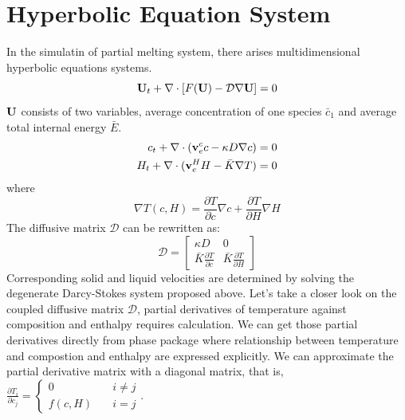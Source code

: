 \section{Hyperbolic Equation System}
In the simulatin of partial melting system, 
there arises multidimensional hyperbolic equations systems.
\begin{equation}
		  \bold{U}_t + \nabla \cdot [F(\bold{U}) - \mathcal{D}\nabla \bold{U}] = 0
\end{equation}
$\bold{U}$ consists of two variables, average concentration of one species $\bar{c}_1$ and 
average total internal energy $\bar{E}$.
\begin{equation}
		  \begin{aligned}
					 c_t + \nabla \cdot (\bold{v}^c_e c - \kappa D \nabla c) &= 0\\
					 H_t + \nabla \cdot (\bold{v}^H_e H - \bar{K}\nabla T) &= 0
		  \end{aligned}
\end{equation}
where 
\begin{equation}
		  \nabla T(c, H) = \frac{\partial T}{\partial c} \nabla c + \frac{\partial T}{\partial H} \nabla H 
\end{equation}
The diffusive matrix $\mathcal{D}$ can be rewritten as:
\begin{equation}
		  \mathcal{D} = \begin{bmatrix}
        \kappa D & 0 \\
					 \bar{K} \frac{\partial T}{\partial c} & \bar{K} \frac{\partial T}{\partial H}
		  \end{bmatrix}
\end{equation}
Corresponding solid and liquid velocities are determined by solving the degenerate Darcy-Stokes system proposed above.
Let's take a closer look on the coupled diffusive matrix $\mathcal{D}$, partial derivatives of temperature against 
composition and enthalpy requires calculation.
We can get those partial derivatives directly from phase package where relationship between temperature and compostion and enthalpy
are expressed explicitly.
We can approximate the partial derivative matrix with a diagonal matrix, that is, $\frac{\partial T_i}{\partial c_j} = \left \{ \begin{aligned} 
		  0 &\quad i\neq j\\
		  f(c,H) & \quad i = j
\end{aligned} \right.$. 

